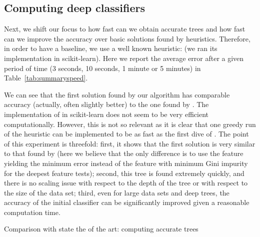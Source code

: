 \documentclass{llncs}
\begin{document}
\subsection{Computing deep classifiers}

Next, we shift our focus to how fast can we obtain accurate trees and how fast can we improve the accuracy over basic solutions found by heuristics.
Therefore, in order to have a baseline, we use a well known heuristic: \cart (we ran its implementation in scikit-learn).
Here we report the average error after a given period of time (3 seconds, 10 seconds, 1 minute or 5 minutes) in Table~\ref{tab:summaryspeed}.


\medskip

We can see that the first solution found by our algorithm has comparable accuracy (actually, often slightly better) to the one found by \cart. The implementation of \cart in scikit-learn does not seem to be very efficient computationally. However, this is not so relevant as it is clear that one greedy run of the heuristic can be implemented to be as fast as the first dive of \budalg. The point of this experiment is threefold: first, it shows that the first solution is very similar to that found by \cart (here we believe that the only difference is to use the feature yielding the minimum error instead of the feature with minimum Gini impurity for the deepest feature tests); second, this tree
is found extremely quickly, and there is no scaling issue with respect to the depth of the tree or with respect to the size of the data set; third, even for large data sets and deep trees, the accuracy of the initial classifier can be significantly improved given a reasonable computation time.




\begin{table}[htbp]
\begin{center}
\begin{footnotesize}
\tabcolsep=1.8pt

\end{footnotesize}
\end{center}
\caption{\label{tab:summaryspeed} Comparison with state the of the art: computing accurate trees}
\end{table}
\end{document}
